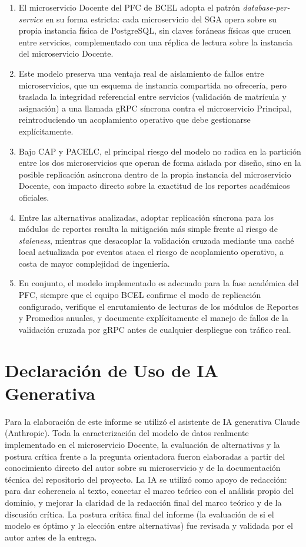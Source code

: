 \documentclass[11pt,a4paper]{article}
\begin{document}
\begin{enumerate}
\item El microservicio Docente del PFC de BCEL adopta el patrón \emph{database-per-service} en su forma estricta: cada microservicio del SGA opera sobre su propia instancia física de PostgreSQL, sin claves foráneas físicas que crucen entre servicios, complementado con una réplica de lectura sobre la instancia del microservicio Docente.

\item Este modelo preserva una ventaja real de aislamiento de fallos entre microservicios, que un esquema de instancia compartida no ofrecería, pero traslada la integridad referencial entre servicios (validación de matrícula y asignación) a una llamada gRPC síncrona contra el microservicio Principal, reintroduciendo un acoplamiento operativo que debe gestionarse explícitamente.

\item Bajo CAP y PACELC, el principal riesgo del modelo no radica en la partición entre los dos microservicios que operan de forma aislada por diseño, sino en la posible replicación asíncrona dentro de la propia instancia del microservicio Docente, con impacto directo sobre la exactitud de los reportes académicos oficiales.

\item Entre las alternativas analizadas, adoptar replicación síncrona para los módulos de reportes resulta la mitigación más simple frente al riesgo de \emph{staleness}, mientras que desacoplar la validación cruzada mediante una caché local actualizada por eventos ataca el riesgo de acoplamiento operativo, a costa de mayor complejidad de ingeniería.

\item En conjunto, el modelo implementado es adecuado para la fase académica del PFC, siempre que el equipo BCEL confirme el modo de replicación configurado, verifique el enrutamiento de lecturas de los módulos de Reportes y Promedios anuales, y documente explícitamente el manejo de fallos de la validación cruzada por gRPC antes de cualquier despliegue con tráfico real.
\end{enumerate}

\section{Declaración de Uso de IA Generativa}

Para la elaboración de este informe se utilizó el asistente de IA generativa Claude (Anthropic). Toda la caracterización del modelo de datos realmente implementado en el microservicio Docente, la evaluación de alternativas y la postura crítica frente a la pregunta orientadora fueron elaboradas a partir del conocimiento directo del autor sobre su microservicio y de la documentación técnica del repositorio del proyecto. La IA se utilizó como apoyo de redacción: para dar coherencia al texto, conectar el marco teórico con el análisis propio del dominio, y mejorar la claridad de la redacción final del marco teórico y de la discusión crítica. La postura crítica final del informe (la evaluación de si el modelo es óptimo y la elección entre alternativas) fue revisada y validada por el autor antes de la entrega.



\end{document}
